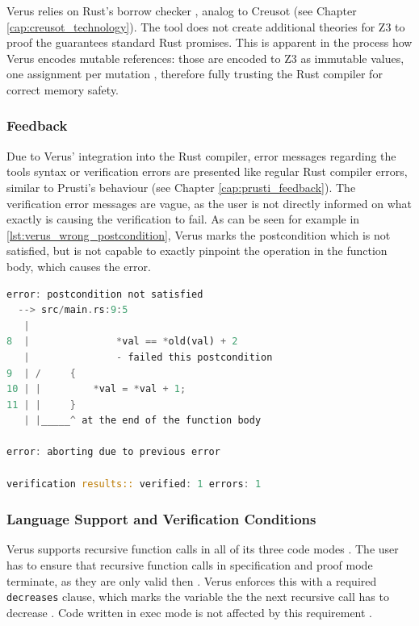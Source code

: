 Verus relies on Rust's borrow checker \cite{lattuadaVerusVerifyingRust2023}, analog to Creusot (see Chapter \ref{cap:creusot_technology}). The tool does not create additional theories for Z3 to proof the guarantees standard Rust promises. This is apparent in the process how Verus encodes mutable references: those are encoded to Z3 as immutable values, one assignment per mutation \cite{lattuadaVerusVerifyingRust2023}, therefore fully trusting the Rust compiler for correct memory safety. 

\subsubsection{Feedback}
Due to Verus' integration into the Rust compiler, error messages regarding the tools syntax or verification errors are presented like regular Rust compiler errors, similar to Prusti's behaviour (see Chapter \ref{cap:prusti_feedback}). The verification error messages are vague, as the user is not directly informed on what exactly is causing the verification to fail. As can be seen for example in \autoref{lst:verus_wrong_postcondition}, Verus marks the postcondition which is not satisfied, but is not capable to exactly pinpoint the operation in the function body, which causes the error.

\begin{lstlisting}[float, language=Rust, caption=Example output of a verification error in Verus, label={lst:verus_wrong_postcondition}]
error: postcondition not satisfied
  --> src/main.rs:9:5
   |
8  |               *val == *old(val) + 2
   |               - failed this postcondition
9  | /     {
10 | |         *val = *val + 1;
11 | |     }
   | |_____^ at the end of the function body

error: aborting due to previous error

verification results:: verified: 1 errors: 1
\end{lstlisting}

\subsubsection{Language Support and Verification Conditions}

Verus supports recursive function calls in all of its three code modes \cite{lattuadaVerusVerifyingRust2023}. The user has to ensure that recursive function calls in specification and proof mode terminate, as they are only valid then \cite{lattuadaVerusVerifyingRust2023}. Verus enforces this with a required \lstinline{decreases} clause, which marks the variable the the next recursive call has to decrease \cite{lattuadaVerusVerifyingRust2023}. Code written in exec mode is not affected by this requirement \cite{lattuadaVerusVerifyingRust2023}.

